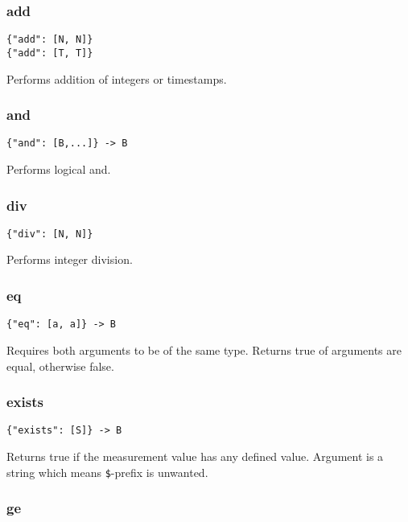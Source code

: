 \documentclass[a4paper]{article}
\begin{document}
\subsubsection{add}

\begin{verbatim}
{"add": [N, N]}
{"add": [T, T]}
\end{verbatim}

Performs addition of integers or timestamps.

\subsubsection{and}

\begin{verbatim}
{"and": [B,...]} -> B
\end{verbatim}

Performs logical and. 

\subsubsection{div}

\begin{verbatim}
{"div": [N, N]}
\end{verbatim}

Performs integer division.

\subsubsection{eq}

\begin{verbatim}
{"eq": [a, a]} -> B
\end{verbatim}

Requires both arguments to be of the same type. Returns true of
arguments are equal, otherwise false.

\subsubsection{exists}

\begin{verbatim}
{"exists": [S]} -> B
\end{verbatim}

Returns true if the measurement value has any defined value. Argument is a string which means \verb|$|-prefix
is unwanted. 

\subsubsection{ge}
\end{document}
